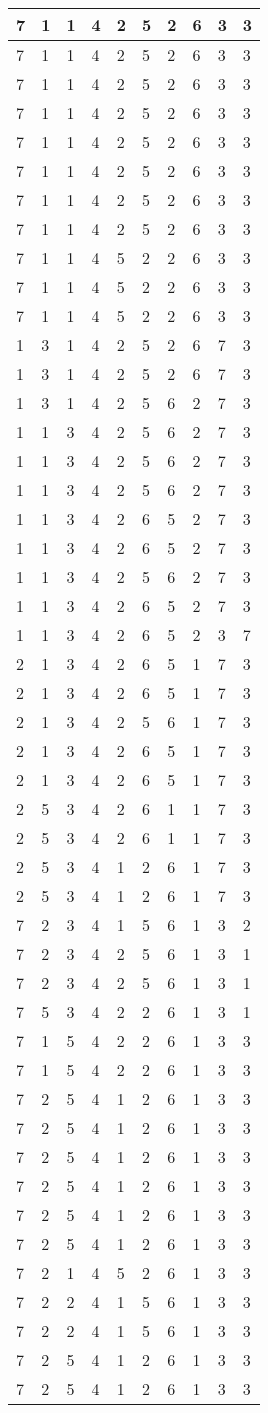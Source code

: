 \begin{longtable}[]{@{}llllllllll@{}}
\toprule
7 & 1 & 1 & 4 & 2 & 5 & 2 & 6 & 3 & 3\tabularnewline
\midrule
\endhead
7 & 1 & 1 & 4 & 2 & 5 & 2 & 6 & 3 & 3\tabularnewline
7 & 1 & 1 & 4 & 2 & 5 & 2 & 6 & 3 & 3\tabularnewline
7 & 1 & 1 & 4 & 2 & 5 & 2 & 6 & 3 & 3\tabularnewline
7 & 1 & 1 & 4 & 2 & 5 & 2 & 6 & 3 & 3\tabularnewline
7 & 1 & 1 & 4 & 2 & 5 & 2 & 6 & 3 & 3\tabularnewline
7 & 1 & 1 & 4 & 2 & 5 & 2 & 6 & 3 & 3\tabularnewline
7 & 1 & 1 & 4 & 2 & 5 & 2 & 6 & 3 & 3\tabularnewline
7 & 1 & 1 & 4 & 5 & 2 & 2 & 6 & 3 & 3\tabularnewline
7 & 1 & 1 & 4 & 5 & 2 & 2 & 6 & 3 & 3\tabularnewline
7 & 1 & 1 & 4 & 5 & 2 & 2 & 6 & 3 & 3\tabularnewline
1 & 3 & 1 & 4 & 2 & 5 & 2 & 6 & 7 & 3\tabularnewline
1 & 3 & 1 & 4 & 2 & 5 & 2 & 6 & 7 & 3\tabularnewline
1 & 3 & 1 & 4 & 2 & 5 & 6 & 2 & 7 & 3\tabularnewline
1 & 1 & 3 & 4 & 2 & 5 & 6 & 2 & 7 & 3\tabularnewline
1 & 1 & 3 & 4 & 2 & 5 & 6 & 2 & 7 & 3\tabularnewline
1 & 1 & 3 & 4 & 2 & 5 & 6 & 2 & 7 & 3\tabularnewline
1 & 1 & 3 & 4 & 2 & 6 & 5 & 2 & 7 & 3\tabularnewline
1 & 1 & 3 & 4 & 2 & 6 & 5 & 2 & 7 & 3\tabularnewline
1 & 1 & 3 & 4 & 2 & 5 & 6 & 2 & 7 & 3\tabularnewline
1 & 1 & 3 & 4 & 2 & 6 & 5 & 2 & 7 & 3\tabularnewline
1 & 1 & 3 & 4 & 2 & 6 & 5 & 2 & 3 & 7\tabularnewline
2 & 1 & 3 & 4 & 2 & 6 & 5 & 1 & 7 & 3\tabularnewline
2 & 1 & 3 & 4 & 2 & 6 & 5 & 1 & 7 & 3\tabularnewline
2 & 1 & 3 & 4 & 2 & 5 & 6 & 1 & 7 & 3\tabularnewline
2 & 1 & 3 & 4 & 2 & 6 & 5 & 1 & 7 & 3\tabularnewline
2 & 1 & 3 & 4 & 2 & 6 & 5 & 1 & 7 & 3\tabularnewline
2 & 5 & 3 & 4 & 2 & 6 & 1 & 1 & 7 & 3\tabularnewline
2 & 5 & 3 & 4 & 2 & 6 & 1 & 1 & 7 & 3\tabularnewline
2 & 5 & 3 & 4 & 1 & 2 & 6 & 1 & 7 & 3\tabularnewline
2 & 5 & 3 & 4 & 1 & 2 & 6 & 1 & 7 & 3\tabularnewline
7 & 2 & 3 & 4 & 1 & 5 & 6 & 1 & 3 & 2\tabularnewline
7 & 2 & 3 & 4 & 2 & 5 & 6 & 1 & 3 & 1\tabularnewline
7 & 2 & 3 & 4 & 2 & 5 & 6 & 1 & 3 & 1\tabularnewline
7 & 5 & 3 & 4 & 2 & 2 & 6 & 1 & 3 & 1\tabularnewline
7 & 1 & 5 & 4 & 2 & 2 & 6 & 1 & 3 & 3\tabularnewline
7 & 1 & 5 & 4 & 2 & 2 & 6 & 1 & 3 & 3\tabularnewline
7 & 2 & 5 & 4 & 1 & 2 & 6 & 1 & 3 & 3\tabularnewline
7 & 2 & 5 & 4 & 1 & 2 & 6 & 1 & 3 & 3\tabularnewline
7 & 2 & 5 & 4 & 1 & 2 & 6 & 1 & 3 & 3\tabularnewline
7 & 2 & 5 & 4 & 1 & 2 & 6 & 1 & 3 & 3\tabularnewline
7 & 2 & 5 & 4 & 1 & 2 & 6 & 1 & 3 & 3\tabularnewline
7 & 2 & 5 & 4 & 1 & 2 & 6 & 1 & 3 & 3\tabularnewline
7 & 2 & 1 & 4 & 5 & 2 & 6 & 1 & 3 & 3\tabularnewline
7 & 2 & 2 & 4 & 1 & 5 & 6 & 1 & 3 & 3\tabularnewline
7 & 2 & 2 & 4 & 1 & 5 & 6 & 1 & 3 & 3\tabularnewline
7 & 2 & 5 & 4 & 1 & 2 & 6 & 1 & 3 & 3\tabularnewline
7 & 2 & 5 & 4 & 1 & 2 & 6 & 1 & 3 & 3\tabularnewline

\end{longtable}
